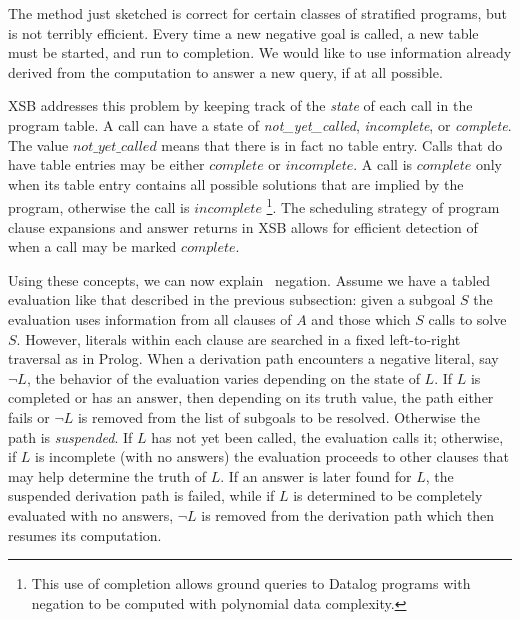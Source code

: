 The method just sketched is correct for certain classes of stratified
programs, but is not terribly efficient.  Every time a new negative
goal is called, a new table must be started, and run to completion.
We would like to use information already derived from the computation
to answer a new query, if at all possible.

XSB addresses this problem by keeping track of the {\em state} of each
call in the program table.  A call can have a state of {\em
not\_yet\_called}, {\em incomplete}, or {\em complete}.  The value
$not\_yet\_called$ means that there is in fact no table entry.  Calls
that do have table entries may be either $complete$ or $incomplete$.
A call is $complete$ only when its table entry contains all possible
solutions that are implied by the program, otherwise the call is
$incomplete$
%
\footnote{This use of completion allows ground queries to
Datalog programs with negation to be computed with polynomial data
complexity.}.
%
The scheduling strategy of program clause expansions and answer
returns in XSB allows for efficient detection of when a call may be
marked $complete$.

Using these concepts, we can now explain \LRD\ negation.  Assume we
have a tabled evaluation like that described in the previous
subsection: given a subgoal $S$ the evaluation uses information from
all clauses of $A$ and those which $S$ calls to solve $S$.  However,
literals within each clause are searched in a fixed left-to-right
traversal as in Prolog.  When a derivation path encounters a negative
literal, say $\neg L$, the behavior of the evaluation varies depending
on the state of $L$.  If $L$ is completed or has an answer, then
depending on its truth value, the path either fails or $\neg L$ is
removed from the list of subgoals to be resolved.  Otherwise the path
is {\em suspended}.  If $L$ has not yet been called, the evaluation
calls it; otherwise, if $L$ is incomplete (with no answers) the
evaluation proceeds to other clauses that may help determine the truth
of $L$.  If an answer is later found for $L$, the suspended derivation
path is failed, while if $L$ is determined to be completely evaluated
with no answers, $\neg L$ is removed from the derivation path which
then resumes its computation.

